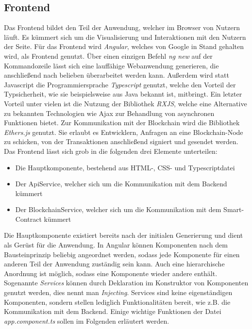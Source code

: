 \subsection{Frontend}
Das Frontend bildet den Teil der Anwendung, welcher im Browser von Nutzern läuft. Es kümmert sich um die Visualisierung und Interaktionen mit den Nutzern der Seite.
Für das Frontend wird \emph{Angular}, welches von Google in Stand gehalten wird, als Frontend genutzt. Über einen einzigen Befehl \emph{ng new} auf der Kommandozeile lässt sich eine lauffähige Webanwendung generieren, die anschließend nach belieben überarbeitet werden kann. Außerdem wird statt Javascript die Programmiersprache \emph{Typescript} genutzt, welche den Vorteil der Typsicherheit, wie sie beispielsweise aus Java bekannt ist, mitbringt. Ein letzter Vorteil unter vielen ist die Nutzung der Bibliothek \emph{RXJS}, welche eine Alternative zu bekannten Technologien wie Ajax zur Behandlung von asynchronen Funktionen bietet.
Zur Kommunikation mit der Blockchain wird die Bibliothek \emph{Ethers.js} genutzt. Sie erlaubt es Entwicklern, Anfragen an eine Blockchain-Node zu schicken, von der Transaktionen anschließend signiert und gesendet werden. Das Frontend lässt sich grob in die folgenden drei Elemente unterteilen:
\begin{itemize}
	\item Die Hauptkomponente, bestehend aus HTML-, CSS- und Typescriptdatei
	\item Der ApiService, welcher sich um die Kommunikation mit dem Backend kümmert
	\item Der BlockchainService, welcher sich um die Kommunikation mit dem Smart-Contract kümmert
\end{itemize}
Die Hauptkomponente existiert bereits nach der initialen Generierung und dient als Gerüst für die Anwendung. In Angular können Komponenten nach dem Bausteinprinzip beliebig angeordnet werden, sodass jede Komponente für einen anderen Teil der Anwendung zuständig sein kann. Auch eine hierarchische Anordnung ist möglich, sodass eine Komponente wieder andere enthält. Sogenannte \emph{Services} können durch Deklaration im Konstruktor von Komponenten genutzt werden, dies nennt man \emph{Injecting}. Services sind keine eigenständigen Komponenten, sondern stellen lediglich Funktionalitäten bereit, wie z.B. die Kommunikation mit dem Backend. Einige wichtige Funktionen der Datei \emph{app.component.ts} sollen im Folgenden erläutert werden.
